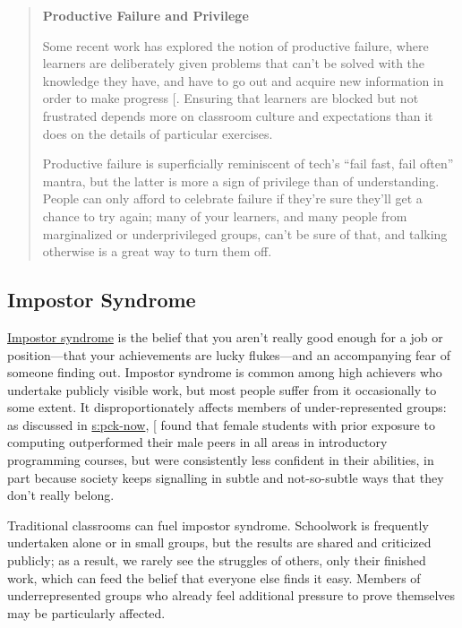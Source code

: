 \begin{quote}\setlength{\parindent}{0pt}
\textbf{Productive Failure and Privilege}

Some recent work has explored the notion of productive failure, where
learners are deliberately given problems that can't be solved with the
knowledge they have, and have to go out and acquire new information in
order to make progress {[}\protect[\hyperlink{b:Kapu2016}{Kapu2016}]{]}. Ensuring that learners are
blocked but not frustrated depends more on classroom culture and
expectations than it does on the details of particular exercises.

Productive failure is superficially reminiscent of tech's ``fail fast,
fail often'' mantra, but the latter is more a sign of privilege than of
understanding. People can only afford to celebrate failure if they're
sure they'll get a chance to try again; many of your learners, and
many people from marginalized or underprivileged groups, can't be sure
of that, and talking otherwise is a great way to turn them off.
\end{quote}

\subsection{Impostor Syndrome}\label{impostor-syndrome}

\protect\hyperlink{g:impostor-syndrome}{Impostor syndrome} is the belief that
you aren't really good enough for a job or position---that your
achievements are lucky flukes---and an accompanying fear of someone
finding out. Impostor syndrome is common among high achievers who
undertake publicly visible work, but most people suffer from it
occasionally to some extent. It disproportionately affects members of
under-represented groups: as discussed in \protect\hyperlink{SECTION}{s:pck-now},
{[}\protect[\hyperlink{b:Wilc2018}{Wilc2018}]{]} found that female students with prior exposure to
computing outperformed their male peers in all areas in introductory
programming courses, but were consistently less confident in their
abilities, in part because society keeps signalling in subtle and
not-so-subtle ways that they don't really belong.

Traditional classrooms can fuel impostor syndrome. Schoolwork is
frequently undertaken alone or in small groups, but the results are
shared and criticized publicly; as a result, we rarely see the struggles
of others, only their finished work, which can feed the belief that
everyone else finds it easy. Members of underrepresented groups who
already feel additional pressure to prove themselves may be particularly
affected.

